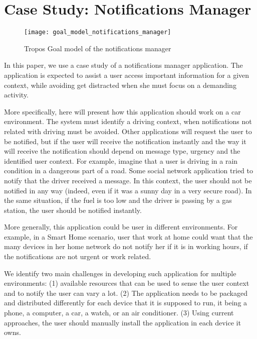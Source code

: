 \section{Case Study: Notifications Manager}
\label{sec:notifications_manager}

\begin{figure*}[!htb]
 \centering
 \texttt{[image: goal\_model\_notifications\_manager]}
 \caption{Tropos Goal model of the notifications manager}
\label{fig:goal_model_distraction_manager}
\end{figure*}

In this paper, we use a case study of a notifications manager application. The application is expected to assist a user access important information for a given context, while avoiding get distracted when she must focus on a demanding activity.

More specifically, here will present how this application should work on a car environment.
The system must identify a driving context, when notifications not related with driving must be avoided.
Other applications will request the user to be notified, but if the user will receive the notification instantly and the way it will receive the notification should depend on message type, urgency and the identified user context.
For example, imagine that a user is driving in a rain condition in a dangerous part of a road.
Some social network application tried to notify that the driver received a message. In this context, the user should not be notified in any way (indeed, even if it was a sunny day in a very secure road).
In the same situation, if the fuel is too low and the driver is passing by a gas station, the user should be notified instantly.

More generally, this application could be user in different environments. For example, in a Smart Home scenario, user that work at home could want that the many devices in her home network do not notify her if it is in working hours, if the notifications are not urgent or work related.

We identify two main challenges in developing such application for multiple environments: (1) available resources that can be used to sense the user context and to notify the user can vary a lot. (2) The application needs to be packaged and distributed differently for each device that it is supposed to run, it being a phone, a computer, a car, a watch, or an air conditioner. (3) Using current approaches, the user should manually install the application in each device it owns.
